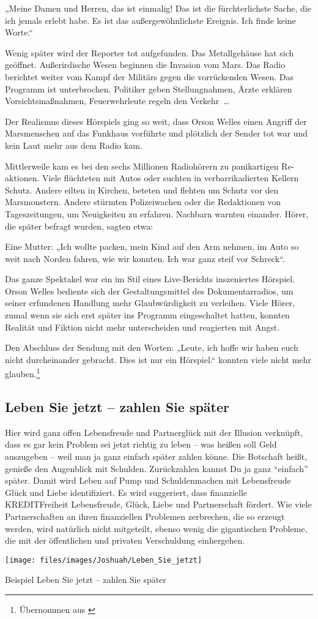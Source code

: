 „Meine Damen und Herren, das ist einmalig! Das ist die fürchterlichste Sache, die ich jemals erlebt
habe. Es ist das außergewöhnlichste Ereignis. Ich finde keine Worte.“

Wenig später wird der Reporter tot aufgefunden. Das Metallgehäuse hat sich geöffnet. Außerirdische
Wesen beginnen die Invasion vom Mars. Das Radio berichtet weiter vom Kampf der Militärs gegen die
vorrückenden Wesen. Das Programm ist unterbrochen. Politiker geben Stellungnahmen, Ärzte erklären
Vorsichtsmaßnahmen, Feuerwehrleute regeln den Verkehr~\dots

Der Realismus dieses Hörspiels ging so weit, dass Orson Welles einen Angriff der Marsmenschen auf das
Funkhaus vorführte und plötzlich der Sender tot war und kein Laut mehr aus dem Radio kam.

Mittlerweile kam es bei den sechs Millionen Radiohörern zu panikartigen Re-aktionen. Viele flüchteten
mit Autos oder suchten in verbarrikadierten Kellern Schutz. Andere eilten in Kirchen, beteten und
flehten um Schutz vor den Marsmonstern. Andere stürmten Polizeiwachen oder die Redaktionen von
Tageszeitungen, um Neuigkeiten zu erfahren. Nachbarn warnten einander. Hörer, die später befragt
wurden, sagten etwa:

Eine Mutter: „Ich wollte packen, mein Kind auf den Arm nehmen, im Auto so weit nach Norden fahren,
wie wir konnten. Ich war ganz steif vor Schreck“.

Das ganze Spektakel war ein im Stil eines Live-Berichts inszeniertes Hörspiel. Orson Welles bediente
sich der Gestaltungsmittel des Dokumentarradios, um seiner erfundenen Handlung mehr Glaubwürdigkeit
zu verleihen. Viele Hörer, zumal wenn sie sich erst später ins Programm eingeschaltet hatten, konnten
Realität und Fiktion nicht mehr unterscheiden und reagierten mit Angst.

Den Abschluss der Sendung mit den Worten: „Leute, ich hoffe wir haben euch nicht durcheinander
gebracht. Dies ist nur ein Hörspiel.“ konnten viele nicht mehr glauben.\footnote{Übernommen aus
\cite[4]{Stuttgart:Manipulation}}

\subsection{Leben Sie jetzt -- zahlen Sie später}
Hier wird ganz offen Lebensfreude und Partnerglück mit der Illusion verknüpft, dass es gar kein
Problem sei jetzt richtig zu leben -- was heißen soll Geld auszugeben -- weil man ja ganz einfach
später zahlen könne. Die Botschaft heißt, genieße den Augenblick mit Schulden. Zurückzahlen kannst Du
ja ganz \enquote{einfach} später. Damit wird Leben auf Pump und Schuldenmachen mit
Lebensfreude Glück und Liebe identifiziert. Es wird suggeriert, dass finanzielle KREDITFreiheit
Lebensfreude, Glück, Liebe und Partnerschaft fördert. Wie viele Partnerschaften an ihren finanziellen
Problemen zerbrechen, die so erzeugt werden, wird natürlich nicht mitgeteilt, ebenso wenig die
gigantischen Probleme, die mit der öffentlichen und privaten Verschuldung einhergehen.

\begin{figurewrapper}
	\texttt{[image: files/images/Joshuah/Leben\_Sie\_jetzt]}
	\caption{Beispiel Leben Sie jetzt -- zahlen Sie später}
\end{figurewrapper}


\clearpage
\printbibliography[heading=source,keyword=Joshuah]
